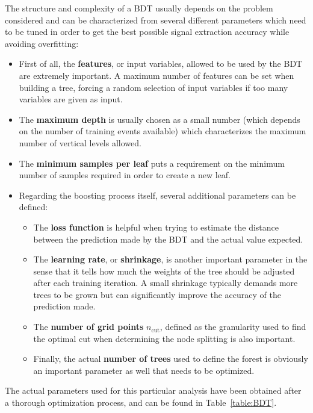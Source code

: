 \documentclass[a4paper, 10pt, openright]{report}
\begin{document}
The structure and complexity of a \ac{BDT} usually depends on the problem considered and can be characterized from several different parameters which need to be tuned in order to get the best possible signal extraction accuracy while avoiding overfitting:

\begin{itemize}
\item First of all, the \textbf{features}, or input variables, allowed to be used by the \ac{BDT} are extremely important. A maximum number of features can be set when building a tree, forcing a random selection of input variables if too many variables are given as input.
\item The \textbf{maximum depth} is usually chosen as a small number (which depends on the number of training events available) which characterizes the maximum number of vertical levels allowed.
\item The \textbf{minimum samples per leaf} puts a requirement on the minimum number of samples required in order to create a new leaf.
\item Regarding the boosting process itself, several additional parameters can be defined:

\begin{itemize}
\item The \textbf{loss function} is helpful when trying to estimate the distance between the prediction made by the \ac{BDT} and the actual value expected.
\item The \textbf{learning rate}, or \textbf{shrinkage}, is another important parameter in the sense that it tells how much the weights of the tree should be adjusted after each training iteration. A small shrinkage typically demands more trees to be grown but can significantly improve the accuracy of the prediction made.
\item The \textbf{number of grid points} $n_\text{cut}$, defined as the granularity used to find the optimal cut when determining the node splitting is also important.
\item Finally, the actual \textbf{number of trees} used to define the forest is obviously an important parameter as well that needs to be optimized.
\end{itemize}

\end{itemize}

The actual parameters used for this particular analysis have been obtained after a thorough optimization process, and can be found in Table~\ref{table:BDT}.
\end{document}
